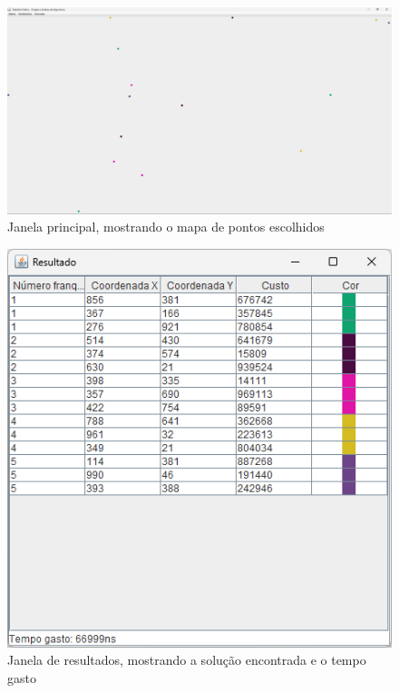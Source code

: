 \documentclass[12pt]{article}
\begin{document}
\begin{figure}[H]
    \centering
    \includegraphics[width=\textwidth]{Captura de tela 2024-06-01 110914}
    \caption{Janela principal, mostrando o mapa de pontos escolhidos}
    \label{fig:fig-3}
\end{figure}

\begin{figure}[H]
    \centering
    \includegraphics[width=\textwidth]{Captura de tela 2024-06-01 110920}
    \caption{Janela de resultados, mostrando a solução encontrada e o tempo gasto}
    \label{fig:fig-4}
\end{figure}
\end{document}
